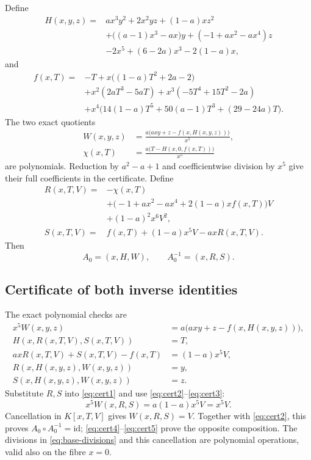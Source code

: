 \documentclass[11pt,a4paper]{article}
\newcommand{\id}{\mathrm{id}}
\newcommand{\comp}{\circ}
\begin{document}
Define
\begin{equation}\label{eq:H}
\begin{aligned}
H(x,y,z)={}&ax^3y^2+2x^2yz+(1-a)xz^2\\
&+\bigl((a-1)x^3-ax\bigr)y+(-1+ax^2-ax^4)z\\
&-2x^5+(6-2a)x^3-2(1-a)x,
\end{aligned}
\end{equation}
and
\begin{equation}\label{eq:f}
\begin{aligned}
f(x,T)={}&-T+x\bigl((1-a)T^2+2a-2\bigr)\\
&+x^2(2aT^3-5aT)+x^3(-5T^4+15T^2-2a)\\
&+x^4\bigl(14(1-a)T^5+50(a-1)T^3+(29-24a)T\bigr).
\end{aligned}
\end{equation}
The two exact quotients
\begin{equation}\label{eq:base-divisions}
\begin{aligned}
W(x,y,z)&=\frac{a\bigl(axy+z-f(x,H(x,y,z))\bigr)}{x^5},\\
\chi(x,T)&=\frac{a\bigl(T-H(x,0,f(x,T))\bigr)}{x^5}
\end{aligned}
\end{equation}
are polynomials. Reduction by $a^2-a+1$ and coefficientwise division
by $x^5$ give their full coefficients in the certificate.
Define
\begin{equation}\label{eq:RS}
\begin{aligned}
R(x,T,V)={}&-\chi(x,T)\\
&+\bigl(-1+ax^2-ax^4+2(1-a)xf(x,T)\bigr)V\\
&+(1-a)^2x^6V^2,\\[2pt]
S(x,T,V)={}&f(x,T)+(1-a)x^5V-axR(x,T,V).
\end{aligned}
\end{equation}
Then
\[
A_0=(x,H,W),\qquad A_0^{-1}=(x,R,S).
\]

\subsection{Certificate of both inverse identities}

The exact polynomial checks are
\begin{align}
x^5W(x,y,z)&=a\bigl(axy+z-f(x,H(x,y,z))\bigr),\label{eq:cert1}\\
H(x,R(x,T,V),S(x,T,V))&=T,\label{eq:cert2}\\
axR(x,T,V)+S(x,T,V)-f(x,T)&=(1-a)x^5V,\label{eq:cert3}\\
R(x,H(x,y,z),W(x,y,z))&=y,\label{eq:cert4}\\
S(x,H(x,y,z),W(x,y,z))&=z.\label{eq:cert5}
\end{align}
Substitute $R,S$ into \eqref{eq:cert1} and use
\eqref{eq:cert2}--\eqref{eq:cert3}:
\[
x^5W(x,R,S)=a(1-a)x^5V=x^5V.
\]
Cancellation in $K[x,T,V]$ gives $W(x,R,S)=V$.
Together with \eqref{eq:cert2}, this proves $A_0\comp A_0^{-1}=\id$;
\eqref{eq:cert4}--\eqref{eq:cert5} prove the opposite composition.
The divisions in \eqref{eq:base-divisions} and this cancellation are
polynomial operations, valid also on the fibre $x=0$.
\end{document}
